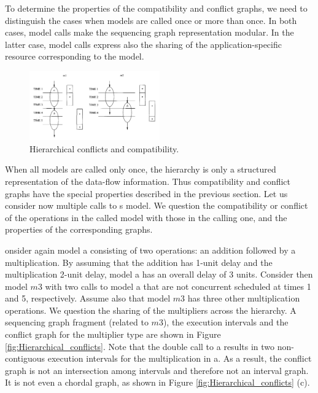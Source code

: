 To determine the properties of the compatibility and conflict graphs, we need to distinguish the cases when models are called once or more than once. In both cases, model calls make the sequencing graph representation modular. In the latter case, model calls express also the sharing of the application-specific resource corresponding to the model. 


\begin{figure}[h]
    \centering
    \includegraphics[width=0.5\textwidth]{Hierarchical_conflicts_and_compatibility}
    \caption{ Hierarchical conflicts and compatibility. \cite{b1}}
    \label{fig:Hierarchical_conflicts_and_compatibility}
\end{figure}


When all models are called only once, the hierarchy is only a structured representation of the data-flow information. Thus compatibility and conflict graphs have 
the special properties described in the previous section. 
Let us consider now multiple calls to s model. We question the compatibility 
or conflict of the operations in the called model with those in the calling one, and the 
properties of the corresponding graphs. 


onsider again model a consisting of two operations: an addition followed by a multiplication. By assuming that the addition has 1-unit delay and the multiplication 2-unit delay, model a has an overall delay of 3 units. Consider then model $ m3 $ with two calls to model a that are not concurrent scheduled at times 1 and 5, respectively. Assume also that model $ m3 $ has three other multiplication operations. We question the sharing of the multipliers across the hierarchy. 
A sequencing graph fragment (related to $ m3 $), the execution intervals and the conflict graph for the multiplier type are shown in Figure \ref{fig:Hierarchical_conflicts}. Note that the double call to a results in two non-contiguous execution intervals for the multiplication in a. As a result, the conflict graph is not an intersection among intervals and therefore not an interval graph. It is not even a chordal graph, as shown in Figure \ref{fig:Hierarchical_conflicts} (c).

